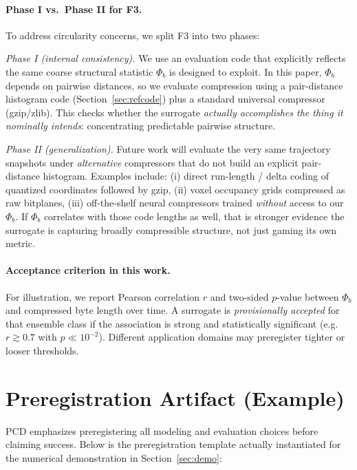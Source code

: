\documentclass[11pt]{article}
\begin{document}
\paragraph{Phase I vs.\ Phase II for F3.}
To address circularity concerns, we split F3 into two phases:

\emph{Phase I (internal consistency).}
We use an evaluation code that explicitly reflects the same coarse structural statistic $\Phi_b$ is designed to exploit.
In this paper, $\Phi_b$ depends on pairwise distances, so we evaluate compression using a pair-distance histogram code (Section~\ref{sec:refcode}) plus a standard universal compressor (gzip/zlib).
This checks whether the surrogate \emph{actually accomplishes the thing it nominally intends}: concentrating predictable pairwise structure.

\emph{Phase II (generalization).}
Future work will evaluate the very same trajectory snapshots under \emph{alternative} compressors that do not build an explicit pair-distance histogram.
Examples include:
(i) direct run-length / delta coding of quantized coordinates followed by gzip,
(ii) voxel occupancy grids compressed as raw bitplanes,
(iii) off-the-shelf neural compressors trained \emph{without} access to our $\Phi_b$.
If $\Phi_b$ correlates with those code lengths as well, that is stronger evidence the surrogate is capturing broadly compressible structure, not just gaming its own metric.

\paragraph{Acceptance criterion in this work.}
For illustration, we report Pearson correlation $r$ and two-sided $p$-value between $\Phi_b$ and compressed byte length over time.
A surrogate is \emph{provisionally accepted} for that ensemble class if the association is strong and statistically significant (e.g.\ $r\gtrsim 0.7$ with $p\ll 10^{-2}$).
Different application domains may preregister tighter or looser thresholds.

\section{Preregistration Artifact (Example)}
\label{sec:prereg}
PCD emphasizes preregistering all modeling and evaluation choices before claiming success.
Below is the preregistration template actually instantiated for the numerical demonstration in Section~\ref{sec:demo}:
\end{document}
